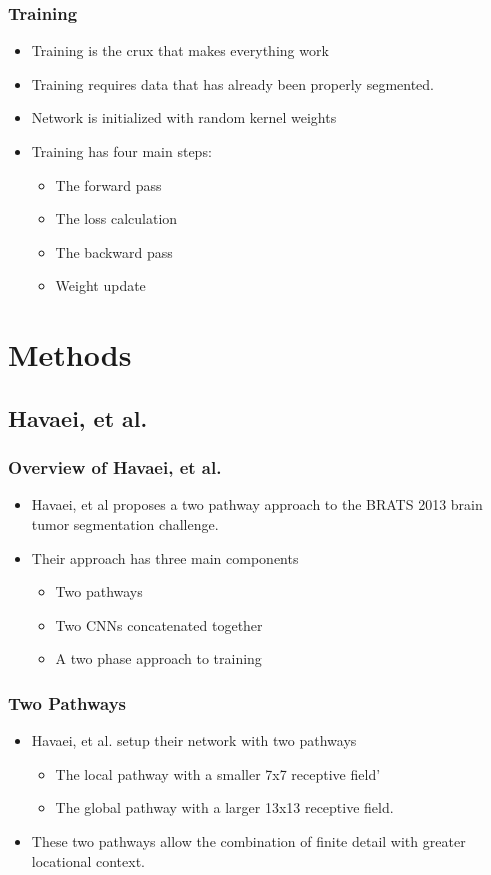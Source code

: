 \documentclass{beamer}
\begin{document}
\begin{frame}
  \frametitle{Training}
  \begin{itemize}
	\item Training is the crux that makes everything work
	\pause
	\item Training requires data that has already been properly segmented.
	\pause
	\item Network is initialized with random kernel weights
	\pause
	\item Training has four main steps:
	\pause
	\begin{itemize}
	  \item The forward pass
	  \pause
	  \item The loss calculation
	  \pause
	  \item The backward pass
	  \pause
	  \item Weight update
	\end{itemize}
  \end{itemize}
\end{frame}

\section*{Methods}

\subsection*{Havaei, et al.}

\begin{frame}
  \frametitle{Overview of Havaei, et al.}
  \begin{itemize}
	\item Havaei, et al proposes a two pathway approach to the BRATS 2013 brain tumor segmentation challenge.
	\pause
	\item Their approach has three main components
	\pause
	\begin{itemize}
	  \item Two pathways
	  \pause
	  \item Two CNNs concatenated together
	  \pause
	  \item A two phase approach to training
	\end{itemize}
  \end{itemize}
\end{frame}

\begin{frame}
  \frametitle{Two Pathways}
  \begin{itemize}
	\item Havaei, et al. setup their network with two pathways
	\pause
	\begin{itemize}
	  \item The local pathway with a smaller 7x7 receptive field'
	  \item The global pathway with a larger 13x13 receptive field.
	\end{itemize}
	\pause
	\item These two pathways allow the combination of finite detail with greater locational context.
  \end{itemize}
\end{frame}
\end{document}
